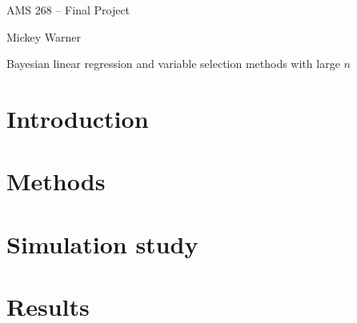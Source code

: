 \documentclass[12pt]{article}
\begin{document}
AMS 268 -- Final Project

Mickey Warner
\bigskip
\bigskip

{\Large Bayesian linear regression and variable selection methods with large $n$}


\section{Introduction}

\cite{qian2017big}

\section{Methods}

\section{Simulation study}


\section{Results}






\end{document}
